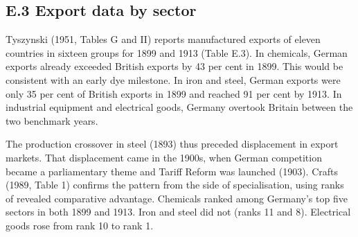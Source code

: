 \hypertarget{e.3-export-data-by-sector}{%
\subsection*{E.3 Export data by sector}\label{e.3-export-data-by-sector}}

Tyszynski (1951, Tables G and II) reports manufactured exports of eleven
countries in sixteen groups for 1899 and 1913 (Table E.3). In chemicals,
German exports already exceeded British exports by 43 per cent in 1899.
This would be consistent with an early dye milestone. In iron and steel,
German exports were only 35 per cent of British exports in 1899 and
reached 91 per cent by 1913. In industrial equipment and electrical
goods, Germany overtook Britain between the two benchmark years.

The production crossover in steel (1893) thus preceded displacement in
export markets. That displacement came in the 1900s, when German
competition became a parliamentary theme and Tariff Reform was launched
(1903). Crafts (1989, Table 1) confirms the pattern from the side of
specialisation, using ranks of revealed comparative advantage. Chemicals
ranked among Germany's top five sectors in both 1899 and 1913. Iron and
steel did not (ranks 11 and 8). Electrical goods rose from rank 10 to
rank 1.

